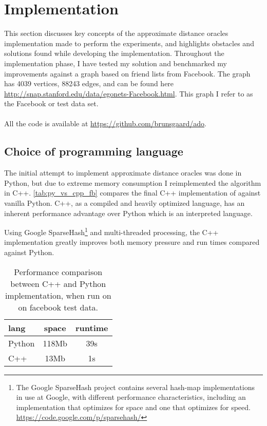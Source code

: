 \chapter{Implementation}
\label{sec:implementation}
This section discusses key concepts of the approximate distance oracles
implementation made to perform the experiments, and highlights obstacles
and solutions found while developing the implementation. Throughout
the implementation phase, I have tested my solution and benchmarked
my improvements against a graph based on friend lists from Facebook.
The graph has 4039 vertices, 88243 edges, and can be found here
\url{http://snap.stanford.edu/data/egonets-Facebook.html}. This graph I refer
to as the Facebook or test data set.\\\\
All the code is available at \url{https://github.com/brunsgaard/ado}.

\section{Choice of programming language}
The initial attempt to implement approximate distance oracles was done in
Python, but due to extreme memory consumption I reimplemented the algorithm
in C++. \autoref{tab:py_vs_cpp_fb} compares the final C++ implementation of
 against vanilla Python. C++, as a compiled and heavily optimized
language, has an inherent performance advantage over Python which is an
interpreted language.

Using Google SparseHash\footnote{The Google SparseHash project contains
several hash-map implementations in use at Google, with different performance
characteristics, including an implementation that optimizes for space and
one that optimizes for speed. \url{https://code.google.com/p/sparsehash/}
} 
and multi-threaded processing, the C++ implementation greatly improves both memory
pressure and run times compared against Python.

\begin{table}[htbp]
    \centering
    \begin{tabular}{ l | c | c }
        \toprule
        lang & space & runtime\\
        \midrule
        Python & 118Mb & 39s\\
        C++ & 13Mb & 1s\\
        \bottomrule
    \end{tabular}
    \caption{Performance comparison between C++ and Python implementation,
             when run on  on facebook test data.}
    \label{tab:py_vs_cpp_fb}
\end{table}

